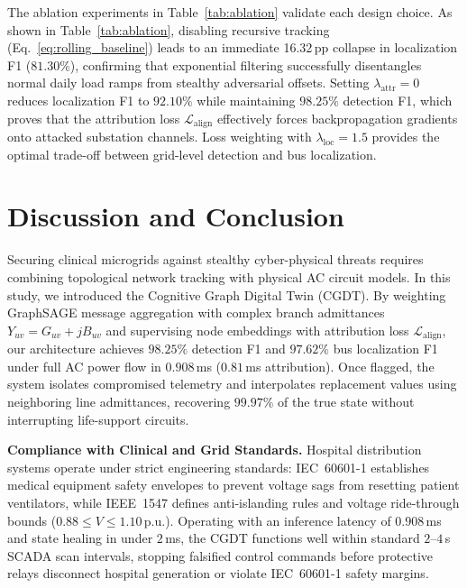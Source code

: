 \documentclass[runningheads]{llncs}
\begin{document}
The ablation experiments in Table~\ref{tab:ablation} validate each design choice.
As shown in Table~\ref{tab:ablation}, disabling recursive tracking (Eq.~\ref{eq:rolling_baseline}) leads to an immediate 16.32\,pp collapse in localization F1 ($81.30\%$), confirming that exponential filtering successfully disentangles normal daily load ramps from stealthy adversarial offsets.
Setting $\lambda_{\mathrm{attr}} = 0$ reduces localization F1 to $92.10\%$ while maintaining $98.25\%$ detection F1, which proves that the attribution loss $\mathcal{L}_{\mathrm{align}}$ effectively forces backpropagation gradients onto attacked substation channels.
Loss weighting with $\lambda_{\mathrm{loc}} = 1.5$ provides the optimal trade-off between grid-level detection and bus localization.

\section{Discussion and Conclusion}
\label{sec:conclusion}

Securing clinical microgrids against stealthy cyber-physical threats requires combining topological network tracking with physical AC circuit models.
In this study, we introduced the Cognitive Graph Digital Twin (CGDT).
By weighting GraphSAGE message aggregation with complex branch admittances $Y_{uv} = G_{uv} + jB_{uv}$ and supervising node embeddings with attribution loss $\mathcal{L}_{\mathrm{align}}$, our architecture achieves $98.25\%$ detection F1 and $97.62\%$ bus localization F1 under full AC power flow in $0.908$\,ms ($0.81$\,ms attribution).
Once flagged, the system isolates compromised telemetry and interpolates replacement values using neighboring line admittances, recovering $99.97\%$ of the true state without interrupting life-support circuits.

\textbf{Compliance with Clinical and Grid Standards.}
Hospital distribution systems operate under strict engineering standards: IEC~60601-1 establishes medical equipment safety envelopes to prevent voltage sags from resetting patient ventilators, while IEEE~1547 defines anti-islanding rules and voltage ride-through bounds ($0.88 \le V \le 1.10$\,p.u.).
Operating with an inference latency of $0.908$\,ms and state healing in under $2$\,ms, the CGDT functions well within standard $2$--$4$\,s SCADA scan intervals, stopping falsified control commands before protective relays disconnect hospital generation or violate IEC~60601-1 safety margins.
\end{document}
